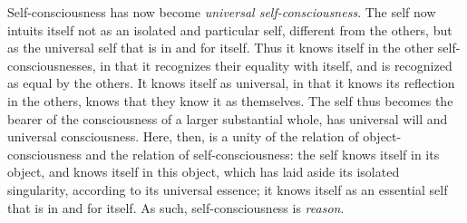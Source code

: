 Self-consciousness has now become \emph{universal self-consciousness}.
The self now intuits itself not as an isolated and particular self,
different from the others, but as the universal self that is in and for
itself. Thus it knows itself in the other self-consciousnesses, in that
it recognizes their equality with itself, and is recognized as equal by
the others. It knows itself as universal, in that it knows its
reflection in the others, knows that they know it as themselves. The
self thus becomes the bearer of the consciousness of a larger
substantial whole, has universal will and universal consciousness. Here,
then, is a unity of the relation of object-consciousness and the
relation of self-consciousness: the self knows itself in its object, and
knows itself in this object, which has laid aside its isolated
singularity, according to its universal essence; it knows itself as an
essential self that is in and for itself. As such, self-consciousness
is \emph{reason}.

